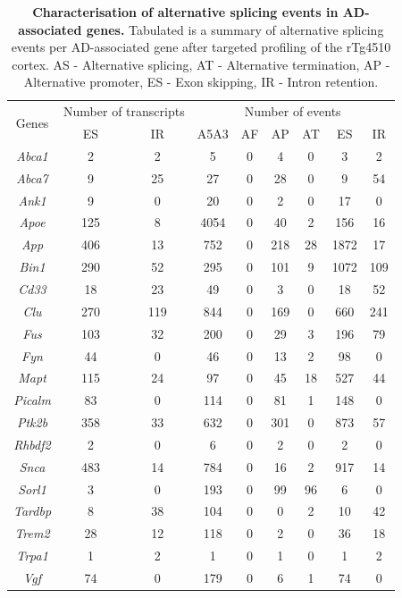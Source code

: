\begin{table}[]
	\centering
	\captionsetup{width=0.95\textwidth}
	\caption[Characterisation of alternative splicing events in AD-associated genes]%
	{\textbf{Characterisation of alternative splicing events in AD-associated genes.} Tabulated is a summary of alternative splicing events per AD-associated gene after targeted profiling of the rTg4510 cortex. AS - Alternative splicing, AT - Alternative termination, AP - Alternative promoter, ES - Exon skipping, IR - Intron retention.}
	\label{tab: merged_targeted_ASevents}
	\setlength\tabcolsep{9pt} %
	\begin{tabular}{@{}ccccccccc@{}}
		\toprule
		\multirow{2}{*}{Genes} & \multicolumn{2}{c}{Number of  transcripts} & \multicolumn{6}{c}{Number of events} \\ \cmidrule(l){2-9} 
		& ES  & IR  & A5A3 & AF & AP  & AT & ES   & IR  \\ \midrule
		\textit{Abca1}  & 2   & 2   & 5    & 0  & 4   & 0  & 3    & 2   \\
		\textit{Abca7}  & 9   & 25  & 27   & 0  & 28  & 0  & 9    & 54  \\
		\textit{Ank1}   & 9   & 0   & 20   & 0  & 2   & 0  & 17   & 0   \\
		\textit{Apoe}   & 125 & 8   & 4054 & 0  & 40  & 2  & 156  & 16  \\
		\textit{App}    & 406 & 13  & 752  & 0  & 218 & 28 & 1872 & 17  \\
		\textit{Bin1}   & 290 & 52  & 295  & 0  & 101 & 9  & 1072 & 109 \\
		\textit{Cd33}   & 18  & 23  & 49   & 0  & 3   & 0  & 18   & 52  \\
		\textit{Clu}    & 270 & 119 & 844  & 0  & 169 & 0  & 660  & 241 \\
		\textit{Fus}    & 103 & 32  & 200  & 0  & 29  & 3  & 196  & 79  \\
		\textit{Fyn}    & 44  & 0   & 46   & 0  & 13  & 2  & 98   & 0   \\
		\textit{Mapt}   & 115 & 24  & 97   & 0  & 45  & 18 & 527  & 44  \\
		\textit{Picalm} & 83  & 0   & 114  & 0  & 81  & 1  & 148  & 0   \\
		\textit{Ptk2b}  & 358 & 33  & 632  & 0  & 301 & 0  & 873  & 57  \\
		\textit{Rhbdf2} & 2   & 0   & 6    & 0  & 2   & 0  & 2    & 0   \\
		\textit{Snca}   & 483 & 14  & 784  & 0  & 16  & 2  & 917  & 14  \\
		\textit{Sorl1}  & 3   & 0   & 193  & 0  & 99  & 96 & 6    & 0   \\
		\textit{Tardbp} & 8   & 38  & 104  & 0  & 0   & 2  & 10   & 42  \\
		\textit{Trem2}  & 28  & 12  & 118  & 0  & 2   & 0  & 36   & 18  \\
		\textit{Trpa1}  & 1   & 2   & 1    & 0  & 1   & 0  & 1    & 2   \\
		\textit{Vgf}    & 74  & 0   & 179  & 0  & 6   & 1  & 74   & 0   \\ \bottomrule
	\end{tabular}
\end{table}

